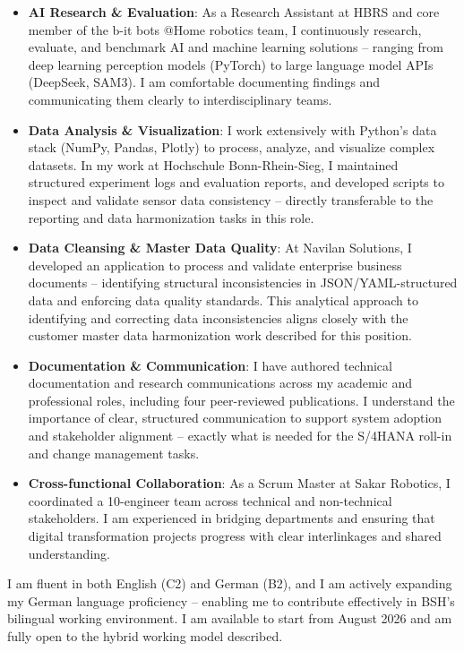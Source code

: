 \documentclass[a4paper,10pt]{article}
\begin{document}
\begin{minipage}{0.97\textwidth}
\begin{itemize}[leftmargin=*]
    \item \textbf{AI Research \& Evaluation}: As a Research Assistant at HBRS and core member of the b-it bots @Home robotics team, I continuously research, evaluate, and benchmark AI and machine learning solutions -- ranging from deep learning perception models (PyTorch) to large language model APIs (DeepSeek, SAM3). I am comfortable documenting findings and communicating them clearly to interdisciplinary teams.
    \item \textbf{Data Analysis \& Visualization}: I work extensively with Python's data stack (NumPy, Pandas, Plotly) to process, analyze, and visualize complex datasets. In my work at Hochschule Bonn-Rhein-Sieg, I maintained structured experiment logs and evaluation reports, and developed scripts to inspect and validate sensor data consistency -- directly transferable to the reporting and data harmonization tasks in this role.
    \item \textbf{Data Cleansing \& Master Data Quality}: At Navilan Solutions, I developed an application to process and validate enterprise business documents -- identifying structural inconsistencies in JSON/YAML-structured data and enforcing data quality standards. This analytical approach to identifying and correcting data inconsistencies aligns closely with the customer master data harmonization work described for this position.
    \item \textbf{Documentation \& Communication}: I have authored technical documentation and research communications across my academic and professional roles, including four peer-reviewed publications. I understand the importance of clear, structured communication to support system adoption and stakeholder alignment -- exactly what is needed for the S/4HANA roll-in and change management tasks.
    \item \textbf{Cross-functional Collaboration}: As a Scrum Master at Sakar Robotics, I coordinated a 10-engineer team across technical and non-technical stakeholders. I am experienced in bridging departments and ensuring that digital transformation projects progress with clear interlinkages and shared understanding.
\end{itemize}

\vspace{10pt}

I am fluent in both English (C2) and German (B2), and I am actively expanding my German language proficiency -- enabling me to contribute effectively in BSH's bilingual working environment. I am available to start from August 2026 and am fully open to the hybrid working model described.


\end{minipage}
\end{document}
